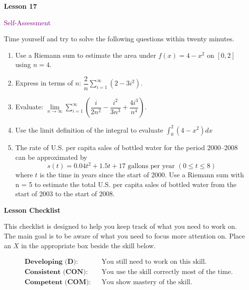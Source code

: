 \documentclass[10pt]{book}
\theoremstyle{definition}
\theoremstyle{remark}
\begin{document}
\begin{tcolorbox}[
  width=\textwidth,
  colback=gray!10, %
  colframe=white, %
  boxrule=0pt,    %
  left=1cm,       %
  right=1cm,      %
  sharp corners  %
]

\begin{minipage}[t]{0.5\textwidth}
  \Huge \textbf{Lesson 17}
\end{minipage}%
\hfill
\begin{minipage}[t]{0.5\textwidth}
  \Huge\textcolor{purple}{Self-Assessment}
\end{minipage}
\end{tcolorbox}

\begin{large}
\noindent
Time yourself and try to solve the following questions within twenty minutes. 
\begin{enumerate}
\item Use a Riemann sum to estimate the area under $f(x) = 4-x^{2}$ on $[0,2]$ using $n=4$.\vfil
\item Express in terms of $n$: $\dfrac{2}{n}\sum_{i=1}^{\infty}(2-3i^{2})$.\vfil
\item Evaluate: $\lim\limits_{n \rightarrow \infty} \sum_{i=1}^{\infty} \left( \dfrac{i}{2n^{2}} - \dfrac{i^{2}}{3n^{3}} + \dfrac{4i^{3}}{n^{4}}\right)$.\vfil
\item Use the limit definition of the integral to evaluate $\displaystyle \int_{0}^{2} (4-x^{2})dx$\vfil
\item The rate of U.S. per capita sales of bottled water for the period 2000–2008 can be approximated by \[s(t) = 0.04t^2 + 1.5t + 17 \text{ gallons per year } (0 \leq t \leq 8)\] where $t$ is the time in years since the start of 2000. Use a Riemann sum with n = 5 to estimate the total U.S. per capita sales of bottled water from the start of 2003 to the start of 2008.\vfil
\end{enumerate}

\noindent
\textbf{Lesson Checklist}
\bigskip

\noindent
This checklist is designed to help you keep track of what you need to work on. The main goal is to be aware of what you need to focus more attention on. Place an $X$ in the appropriate box beside the skill below. 
\bigskip

\noindent
\begin{align*}
&\textbf{Developing (D):} &&\textrm{You still need to work on this skill.}\\
&\textbf{Consistent (CON):} &&\textrm{You use the skill correctly most of the time.}\\
&\textbf{Competent (COM):} &&\textrm{You show mastery of the skill.} 
\end{align*}
\vfil


\end{large}
\end{document}
